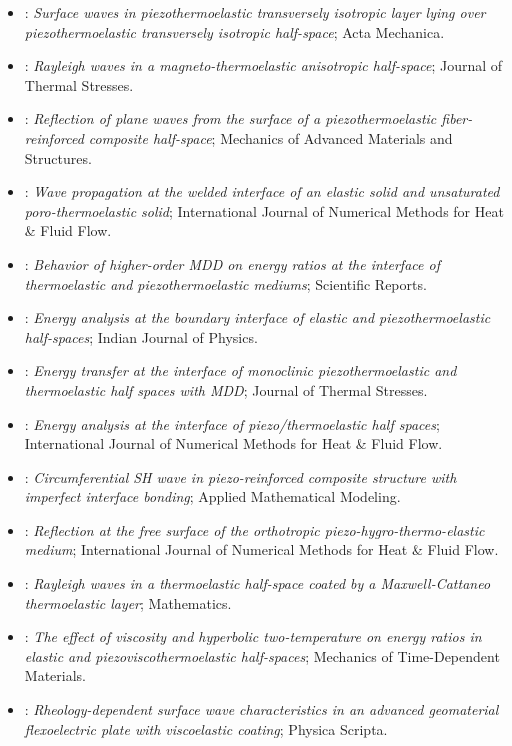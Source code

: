 \begin{itemize}
\item \citet{Biswas2020}: \emph{Surface waves in piezothermoelastic transversely isotropic layer lying over piezothermoelastic transversely isotropic half-space}; Acta Mechanica.
\item \citet{Biswas2020c}: \emph{Rayleigh waves in a magneto-thermoelastic anisotropic half-space}; Journal of Thermal Stresses.
\item \citet{Singh2020b}: \emph{Reflection of plane waves from the surface of a piezothermoelastic fiber-reinforced composite half-space}; Mechanics of Advanced Materials and Structures.
\item \citet{Kumar2022}: \emph{Wave propagation at the welded interface of an elastic solid and unsaturated poro-thermoelastic solid}; International Journal of Numerical Methods for Heat \& Fluid Flow.
\item \citet{Barak2023}: \emph{Behavior of higher-order MDD on energy ratios at the interface of thermoelastic and piezothermoelastic mediums}; Scientific Reports.
\item \citet{Barak2023IJP}: \emph{Energy analysis at the boundary interface of elastic and piezothermoelastic half-spaces}; Indian Journal of Physics.
\item \citet{Barak2023JTS}: \emph{Energy transfer at the interface of monoclinic piezothermoelastic and thermoelastic half spaces with MDD}; Journal of Thermal Stresses.
\item \citet{Gupta2023Energy}: \emph{Energy analysis at the interface of piezo/thermoelastic half spaces}; International Journal of Numerical Methods for Heat \& Fluid Flow.
\item \citet{Kumawat2023}: \emph{Circumferential SH wave in piezo-reinforced composite structure with imperfect interface bonding}; Applied Mathematical Modeling.
\item \citet{Yadav2023}: \emph{Reflection at the free surface of the orthotropic piezo-hygro-thermo-elastic medium}; International Journal of Numerical Methods for Heat \& Fluid Flow.
\item \citet{Chirita2024}: \emph{Rayleigh waves in a thermoelastic half-space coated by a Maxwell-Cattaneo thermoelastic layer}; Mathematics.
\item \citet{Kumar2024}: \emph{The effect of viscosity and hyperbolic two-temperature on energy ratios in elastic and piezoviscothermoelastic half-spaces}; Mechanics of Time-Dependent Materials.
\item \citet{Seema2024}: \emph{Rheology-dependent surface wave characteristics in an advanced geomaterial flexoelectric plate with viscoelastic coating}; Physica Scripta.
\end{itemize}
